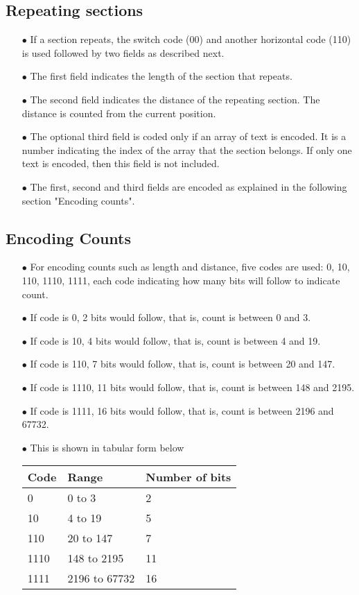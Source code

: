\documentclass[]{article}
\begin{document}
\subsection{Repeating sections}
\begin{itemize}
	\item[$\bullet$] If a section repeats, the switch code (00) and another horizontal code (110) is used followed by two fields as described next.
  	\item[$\bullet$] The first field indicates the length of the section that repeats.
	\item[$\bullet$] The second field indicates the distance of the repeating section. The distance is counted from the current position.
	\item[$\bullet$] The optional third field is coded only if an array of text is encoded. It is a number indicating the index of the array that the section belongs. If only one text is encoded, then this field is not included. 
	\item[$\bullet$] The first, second and third fields are encoded as explained in the following section "Encoding counts".
\end{itemize}

\subsection{Encoding Counts}
\begin{itemize}
	\item[$\bullet$] For encoding counts such as length and distance, five codes are used: 0, 10, 110, 1110, 1111, each code indicating how many bits will follow to indicate count.
	\item[$\bullet$] If code is 0, 2 bits would follow, that is, count is between 0 and 3.
	\item[$\bullet$] If code is 10, 4 bits would follow, that is, count is between 4 and 19.
	\item[$\bullet$] If code is 110, 7 bits would follow, that is, count is between 20 and 147.
	\item[$\bullet$] If code is 1110, 11 bits would follow, that is, count is between 148 and 2195.
	\item[$\bullet$] If code is 1111, 16 bits would follow, that is, count is between 2196 and 67732.
	\item[$\bullet$] This is shown in tabular form below
	\item[] \begin{tabular}{ | l | l | l |} \hline
	\textbf{Code} & \textbf{Range} & \textbf{Number of bits} \\ \hline
	0 & 0 to 3 & 2 \\ \hline
	10 & 4 to 19 & 5 \\ \hline
	110 & 20 to 147 & 7 \\ \hline
	1110 & 148 to 2195 & 11 \\ \hline
	1111 & 2196 to 67732 & 16 \\ \hline
\end{tabular}
\end{itemize}
\end{document}
